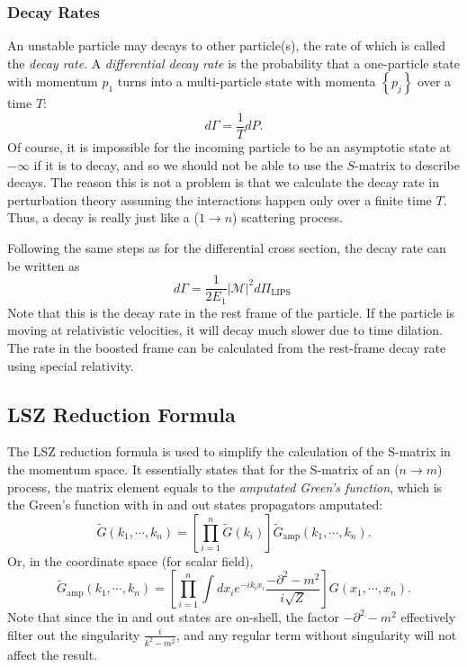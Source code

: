 \documentclass[aps,prb,superscriptaddress,nofootinbib]{revtex4}
\begin{document}
\subsubsection{Decay Rates}
An unstable particle may decays to other particle(s), the rate of which is called the \textit{decay rate}.
A \textit{differential decay rate} is the probability that a one-particle state with momentum $p_{1}$ turns into a multi-particle state with momenta $\left\{p_{j}\right\}$ over a time $T$:
\begin{equation}
	d \Gamma=\frac{1}{T} d P .
\end{equation}
Of course, it is impossible for the incoming particle to be an asymptotic state at $-\infty$ if it is to decay, and so we should not be able to use the $S$-matrix to describe decays. 
The reason this is not a problem is that we calculate the decay rate in perturbation theory assuming the interactions happen only over a finite time $T$. 
Thus, a decay is really just like a ($1 \rightarrow n$) scattering process.

Following the same steps as for the differential cross section, the decay rate can be written as
\begin{equation}
	d \Gamma=\frac{1}{2 E_{1}}|\mathcal{M}|^{2} d \Pi_{\text {LIPS }}
\end{equation}
Note that this is the decay rate in the rest frame of the particle. 
If the particle is moving at relativistic velocities, it will decay much slower due to time dilation. 
The rate in the boosted frame can be calculated from the rest-frame decay rate using special relativity.





\subsection{LSZ Reduction Formula}

The LSZ reduction formula is used to simplify the calculation of the S-matrix in the momentum space.
It essentially states that for the S-matrix of an ($n \rightarrow m$) process, the matrix element equals to the \textit{amputated Green's function}, which is the Green's function with in and out states propagators amputated:
\begin{equation}
	\tilde{G}(k_1,\cdots,k_n) = \left[\prod_{i=1}^n \tilde{G}(k_i) \right] \tilde{G}_{\mathrm{amp}}(k_1,\cdots,k_n).
\end{equation}
Or, in the coordinate space (for scalar field), 
\begin{equation}
	\tilde{G}_{\mathrm{amp}}(k_1,\cdots,k_n) = \left[\prod_{i=1}^n \int d x_i e^{-i k_i x_i} \frac{-\partial^2-m^2}{i\sqrt Z} \right] G(x_1,\cdots,x_n).
\end{equation}
Note that since the in and out states are on-shell, the factor $-\partial^2-m^2$ effectively filter out the singularity $\frac{i}{k^2-m^2}$, and any regular term without singularity will not affect the result.
\end{document}
